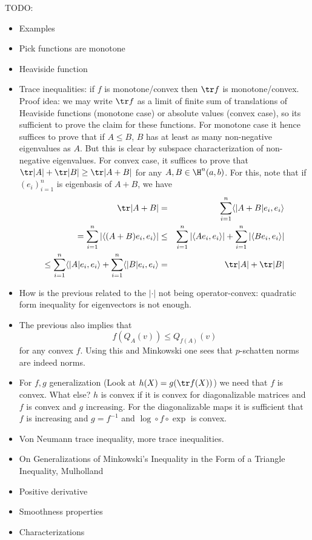 TODO:
\begin{itemize}
	\item Examples
	\item Pick functions are monotone
	\item Heaviside function
	\item Trace inequalities: if $f$ is monotone/convex then $\tr f$ is monotone/convex. Proof idea: we may write $\tr f$ as a limit of finite sum of translations of Heaviside functions (monotone case) or absolute values (convex case), so its sufficient to prove the claim for these functions. For monotone case it hence suffices to prove that if $A \leq B$, $B$ has at least as many non-negative eigenvalues as $A$. But this is clear by subspace characterization of non-negative eigenvalues. For convex case, it suffices to prove that $\tr |A| + \tr |B| \geq \tr |A + B|$ for any $A, B \in \H^{n}(a, b)$. For this, note that if $(e_{i})_{i = 1}^{n}$ is eigenbasis of $A + B$, we have
	\begin{eqnarray*}
		\tr |A + B| &=& \sum_{i = 1}^{n} \langle |A + B| e_{i}, e_{i} \rangle \\
		= \sum_{i = 1}^{n} \left|\langle (A + B) e_{i}, e_{i} \rangle \right| &\leq& \sum_{i = 1}^{n} \left|\langle A e_{i}, e_{i} \rangle \right| + \sum_{i = 1}^{n} \left|\langle B e_{i}, e_{i} \rangle \right| \\
		\leq \sum_{i = 1}^{n} \langle |A| e_{i}, e_{i} \rangle + \sum_{i = 1}^{n} \langle |B| e_{i}, e_{i} \rangle &=& \tr |A| + \tr |B|
	\end{eqnarray*}
	\item How is the previous related to the $|\cdot|$ not being operator-convex: quadratic form inequality for eigenvectors is not enough.
	\item The previous also implies that
	\[
		f(Q_{A}(v)) \leq Q_{f(A)}(v)
	\]
	for any convex $f$. Using this and Minkowski one sees that $p$-schatten norms are indeed norms.
	\item For $f, g$ generalization (Look at $h(X) = g (\tr f(X))$) we need that $f$ is convex. What else? $h$ is convex if it is convex for diagonalizable matrices and $f$ is convex and $g$ increasing. For the diagonalizable maps it is sufficient that $f$ is increasing and $g = f^{-1}$ and $\log \circ f \circ \exp$ is convex.
	\item Von Neumann trace inequality, more trace inequalities.
	\item On Generalizations of Minkowski's Inequality in the Form of a Triangle Inequality, Mulholland
	\item Positive derivative
	\item Smoothness properties
	\item Characterizations
\end{itemize}
